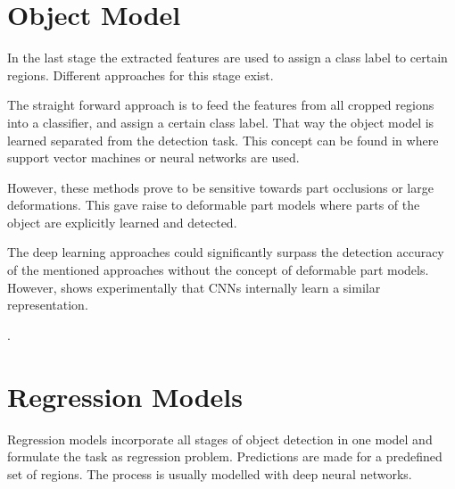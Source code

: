 	\section{Object Model}
	
	In the last stage the extracted features are used to assign a class label to certain regions. Different approaches for this stage exist.
	
	The straight forward approach is to feed the features from all cropped regions into a classifier, and assign a certain class label. That way the object model is learned separated from the detection task. This concept can be found in  where support vector machines or neural networks are used.
	
	However, these methods prove to be sensitive towards part occlusions or large deformations. This gave raise to deformable part models where parts of the object are explicitly learned and detected.  
	
	The deep learning approaches could significantly surpass the detection accuracy of the mentioned approaches without the concept of deformable part models. However,  shows experimentally that \acp{CNN} internally learn a similar representation.
	
	\cite{Viola2004}.

	\section{Regression Models}
	

	Regression models incorporate all stages of object detection in one model and formulate the task as regression problem. Predictions are made for a predefined set of regions. The process is usually modelled with deep neural networks.
	
